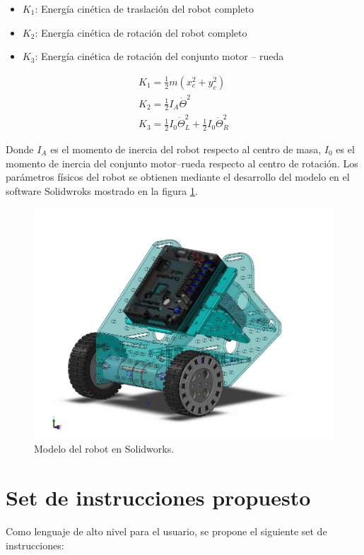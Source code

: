 \documentclass[12pt,a4paper]{article}
\begin{document}
    \begin{itemize}
    	\item	$K_1$: Energía cinética de traslación del robot completo
    	\item	$K_2$: Energía cinética de rotación del robot completo	
    	\item	$K_3$: Energía cinética de rotación del conjunto motor – rueda
    \end{itemize}

	\begin{align}
		K_1 =\frac{1}{2}m\left(x_c^2+y_c^2\right)\\[0.2cm]
        K_2 =\frac{1}{2}I_A\dot{\Theta}^2\\[0.2cm]
        K_3 =\frac{1}{2}I_0\dot{\Theta}^2_L+\frac{1}{2}I_0\dot{\Theta}^2_R
	\end{align}

	Donde $I_A$ es el momento de inercia del robot respecto al centro de masa, $I_0$ es el momento de inercia del conjunto motor--rueda respecto al centro de rotación.
    Los parámetros físicos del robot se obtienen mediante el desarrollo del modelo en el software Solidwroks mostrado en la figura \ref{N6_Solid}.
    
    \begin{figure}[!h]
    \centering
    \includegraphics[width=0.5\linewidth]{./N6_Solid}
    \caption{Modelo del robot en Solidworks.}
    \label{N6_Solid}
    \end{figure}
    
    
    \section{Set de instrucciones propuesto}
    
    Como lenguaje de alto nivel para el usuario, se propone el siguiente set de instrucciones:
    
\end{document}

